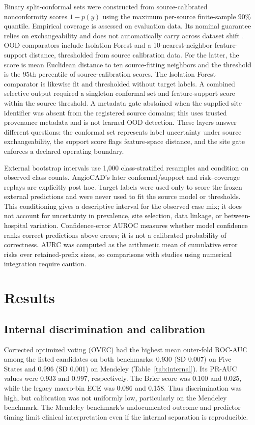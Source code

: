 \documentclass[conference]{IEEEtran}
\begin{document}
Binary split-conformal sets were constructed from source-calibrated nonconformity scores $1-p(y)$ using the maximum per-source finite-sample 90\% quantile. Empirical coverage is assessed on evaluation data. Its nominal guarantee relies on exchangeability and does not automatically carry across dataset shift \cite{angelopoulos2023conformal}. OOD comparators include Isolation Forest and a 10-nearest-neighbor feature-support distance, thresholded from source calibration data. For the latter, the score is mean Euclidean distance to ten source-fitting neighbors and the threshold is the 95th percentile of source-calibration scores. The Isolation Forest comparator is likewise fit and thresholded without target labels. A combined selective output required a singleton conformal set and feature-support score within the source threshold. A metadata gate abstained when the supplied site identifier was absent from the registered source domains; this uses trusted provenance metadata and is not learned OOD detection. These layers answer different questions: the conformal set represents label uncertainty under source exchangeability, the support score flags feature-space distance, and the site gate enforces a declared operating boundary.

External bootstrap intervals use 1,000 class-stratified resamples and condition on observed class counts. AngioCAD's later conformal/support and risk--coverage replays are explicitly post hoc. Target labels were used only to score the frozen external predictions and were never used to fit the source model or thresholds. This conditioning gives a descriptive interval for the observed case mix; it does not account for uncertainty in prevalence, site selection, data linkage, or between-hospital variation. Confidence-error AUROC measures whether model confidence ranks correct predictions above errors; it is not a calibrated probability of correctness. AURC was computed as the arithmetic mean of cumulative error risks over retained-prefix sizes, so comparisons with studies using numerical integration require caution.

\section{Results}
\subsection{Internal discrimination and calibration}
Corrected optimized voting (OVEC) had the highest mean outer-fold ROC-AUC among the listed candidates on both benchmarks: 0.930 (SD 0.007) on Five States and 0.996 (SD 0.001) on Mendeley (Table~\ref{tab:internal}). Its PR-AUC values were 0.933 and 0.997, respectively. The Brier score was 0.100 and 0.025, while the legacy macro-bin ECE was 0.086 and 0.158. Thus discrimination was high, but calibration was not uniformly low, particularly on the Mendeley benchmark. The Mendeley benchmark's undocumented outcome and predictor timing limit clinical interpretation even if the internal separation is reproducible.
\end{document}
